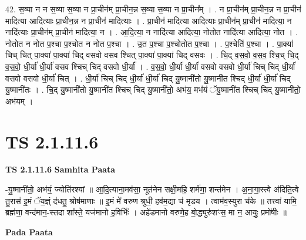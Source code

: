 \documentclass[17pt]{extarticle}
\begin{document}
42. स॒व्या न न स॒व्या स॒व्या न प्रा॒चीन॑म् प्रा॒चीन॒न्न स॒व्या स॒व्या न प्रा॒चीन᳚म् । . न प्रा॒चीन॑म् प्रा॒चीन॒न्न न प्रा॒चीन॑ मादित्या आदित्याः प्रा॒चीन॒न्न न प्रा॒चीन॑ मादित्याः । . प्रा॒चीन॑ मादित्या आदित्याः प्रा॒चीन॑म् प्रा॒चीन॑ मादित्या॒ न नादि॑त्याः प्रा॒चीन॑म् प्रा॒चीन॑ मादित्या॒ न । . आ॒दि॒त्या॒ न नादि॑त्या आदित्या॒ नोतोत नादि॑त्या आदित्या॒ नोत । . नोतोत न नोत प॒श्चा प॒श्चोत न नोत प॒श्चा । . उ॒त प॒श्चा प॒श्चोतोत प॒श्चा । . प॒श्चेति॑ प॒श्चा । . पा॒क्या॑ चिच् चित् पा॒क्या॑ पा॒क्या॑ चिद् वसवो वसव श्चित् पा॒क्या॑ पा॒क्या॑ चिद् वसवः । . चि॒द् व॒स॒वो॒ व॒स॒व॒ श्चि॒च् चि॒द् व॒स॒वो॒ धी॒र्या॑ धी॒र्या॑ वसव श्चिच् चिद् वसवो धी॒र्या᳚ । . व॒स॒वो॒ धी॒र्या॑ धी॒र्या॑ वसवो वसवो धी॒र्या॑ चिच् चिद् धी॒र्या॑ वसवो वसवो धी॒र्या॑ चित् । . धी॒र्या॑ चिच् चिद् धी॒र्या॑ धी॒र्या॑ चिद् यु॒ष्मानी॑तो यु॒ष्मानी॑त श्चिद् धी॒र्या॑ धी॒र्या॑ चिद् यु॒ष्मानी॑तः । . चि॒द् यु॒ष्मानी॑तो यु॒ष्मानी॑त श्चिच् चिद् यु॒ष्मानी॑तो॒ अभ॑य॒ मभ॑यं ॅयु॒ष्मानी॑त श्चिच् चिद् यु॒ष्मानी॑तो॒ अभ॑यम् । \newline
\pagebreak
{}

\section{ TS 2.1.11.6 }

\textbf{TS 2.1.11.6 } \newline
\textbf{Samhita Paata} \newline

-यु॒ष्मानी॑तो॒ अभ॑यं॒ ज्योति॑रश्यां ॥ आ॒दि॒त्याना॒मव॑सा॒ नूत॑नेन सक्षी॒महि॒ शर्म॑णा॒ शन्त॑मेन । अ॒ना॒गा॒स्त्वे अ॑दिति॒त्वे तु॒रास॑ इ॒मं ॅय॒ज्ञ्ं द॑धतु॒ श्रोष॑माणाः ॥ इ॒मं मे॑ वरुण श्रुधी॒ हव॑म॒द्या च॑ मृडय । त्वाम॑व॒स्युरा च॑के ॥ तत्त्वा॑ यामि॒ ब्रह्म॑णा॒ वन्द॑मान॒-स्तदा शा᳚स्ते॒ यज॑मानो ह॒विर्भिः॑ । अहे॑डमानो वरुणे॒ह बो॒द्ध्युरु॑शꣳस॒ मा न॒ आयुः॒ प्रमो॑षीः ॥ \newline

\textbf{Pada Paata} \newline
\end{document}
